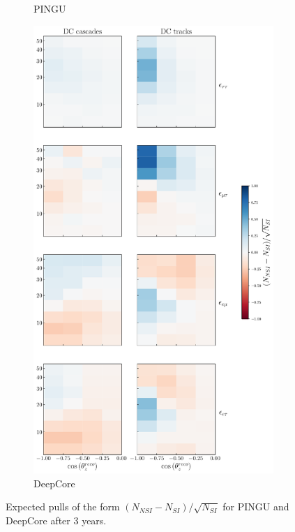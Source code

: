 {{\begin{figure}[t]
\begin{center}
\begin{subfigure}{0.38\textwidth}
         \caption{PINGU}\label{fig:PINGU_event_pulls}
      \end{subfigure}
      \begin{subfigure}{0.4\textwidth}
         \includegraphics[width=1\linewidth]{figures/DC_event_pulls.pdf}
         \caption{DeepCore}\label{fig:DC_event_pulls}
      \end{subfigure}
    \end{center}
   \caption{Expected pulls of the form $(N_{NSI} - N_{SI})/\sqrt{N_{SI}}$ for PINGU and DeepCore after 3 years.}
\end{figure}%

}}
